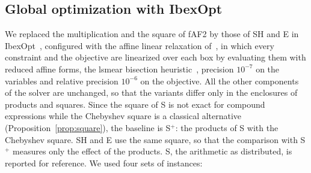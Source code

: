 \documentclass[10pt]{article}
\theoremstyle{definition}
\begin{document}
\begin{table}[H]
\centering
\caption{Time per product ($\mu$s) in the affine arithmetic of Ibex, for random forms with $n$ noise symbols, with and without error terms in the operands (C++, \texttt{-O2}, one core).}
\label{tab:cost}
\small

\end{table}

\subsection{Global optimization with IbexOpt}
\label{sec:solver}

We replaced the multiplication and the square of fAF2 by those of SH and E in IbexOpt~\cite{chabert2009}, configured with the affine linear relaxation of~\cite{ninin2015reliable}, in which every constraint and the objective are linearized over each box by evaluating them with reduced affine forms, the lsmear bisection heuristic~\cite{araya2017}, precision $10^{-7}$ on the variables and relative precision $10^{-6}$ on the objective. All the other components of the solver are unchanged, so that the variants differ only in the enclosures of products and squares. Since the square of S is not exact for compound expressions while the Chebyshev square is a classical alternative (Proposition~\ref{prop:square}), the baseline is S$^+$: the products of S with the Chebyshev square. SH and E use the same square, so that the comparison with S$^+$ measures only the effect of the products. S, the arithmetic as distributed, is reported for reference. We used four sets of instances:
\end{document}
